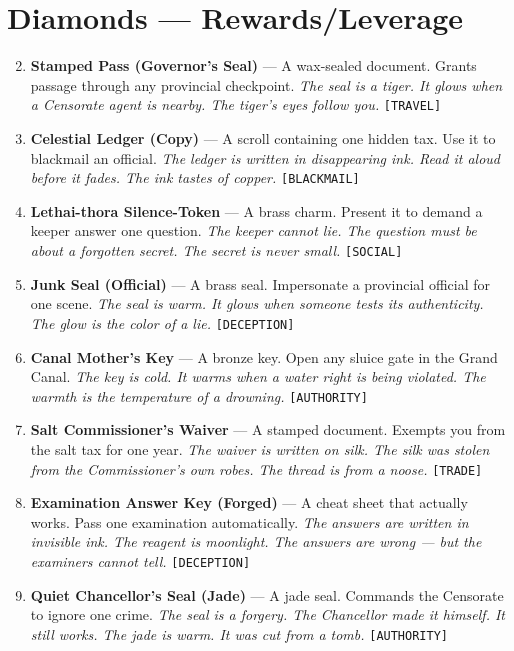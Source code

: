\section*{Diamonds --- Rewards/Leverage}
\label{sec:sihai-rewards}
\begin{enumerate}
\setcounter{enumi}{1}
\item \textbf{Stamped Pass (Governor's Seal)} --- A wax-sealed document. Grants passage through any provincial checkpoint.
  \hfill \textit{The seal is a tiger. It glows when a Censorate agent is nearby. The tiger's eyes follow you.} \texttt{[TRAVEL]}
\item \textbf{Celestial Ledger (Copy)} --- A scroll containing one hidden tax. Use it to blackmail an official.
  \hfill \textit{The ledger is written in disappearing ink. Read it aloud before it fades. The ink tastes of copper.} \texttt{[BLACKMAIL]}
\item \textbf{Lethai-thora Silence-Token} --- A brass charm. Present it to demand a keeper answer one question.
  \hfill \textit{The keeper cannot lie. The question must be about a forgotten secret. The secret is never small.} \texttt{[SOCIAL]}
\item \textbf{Junk Seal (Official)} --- A brass seal. Impersonate a provincial official for one scene.
  \hfill \textit{The seal is warm. It glows when someone tests its authenticity. The glow is the color of a lie.} \texttt{[DECEPTION]}
\item \textbf{Canal Mother's Key} --- A bronze key. Open any sluice gate in the Grand Canal.
  \hfill \textit{The key is cold. It warms when a water right is being violated. The warmth is the temperature of a drowning.} \texttt{[AUTHORITY]}
\item \textbf{Salt Commissioner's Waiver} --- A stamped document. Exempts you from the salt tax for one year.
  \hfill \textit{The waiver is written on silk. The silk was stolen from the Commissioner's own robes. The thread is from a noose.} \texttt{[TRADE]}
\item \textbf{Examination Answer Key (Forged)} --- A cheat sheet that actually works. Pass one examination automatically.
  \hfill \textit{The answers are written in invisible ink. The reagent is moonlight. The answers are wrong --- but the examiners cannot tell.} \texttt{[DECEPTION]}
\item \textbf{Quiet Chancellor's Seal (Jade)} --- A jade seal. Commands the Censorate to ignore one crime.
  \hfill \textit{The seal is a forgery. The Chancellor made it himself. It still works. The jade is warm. It was cut from a tomb.} \texttt{[AUTHORITY]}

\end{enumerate}
